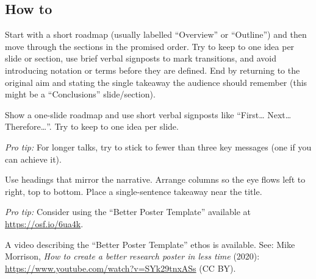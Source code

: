 \documentclass[
  a4paper,
  DIV=11,
  numbers=noendperiod,
  oneside]{scrreprt}
\begin{document}
\subsection{How to}\label{how-to-7}

Start with a short roadmap (usually labelled ``Overview'' or
``Outline'') and then move through the sections in the promised order.
Try to keep to one idea per slide or section, use brief verbal signposts
to mark transitions, and avoid introducing notation or terms before they
are defined. End by returning to the original aim and stating the single
takeaway the audience should remember (this might be a ``Conclusions''
slide/section).

\begin{tcolorbox}[enhanced jigsaw, colframe=quarto-callout-note-color-frame, title=\textcolor{quarto-callout-note-color}{\faInfo}\hspace{0.5em}{Talk Structure}, breakable, opacityback=0, titlerule=0mm, colbacktitle=quarto-callout-note-color!10!white, toptitle=1mm, colback=white, coltitle=black, toprule=.15mm, bottomtitle=1mm, left=2mm, arc=.35mm, rightrule=.15mm, bottomrule=.15mm, opacitybacktitle=0.6, leftrule=.75mm]

Show a one-slide roadmap and use short verbal signposts like
``First\ldots{} Next\ldots{} Therefore\ldots{}''. Try to keep to one
idea per slide.

\emph{Pro tip:} For longer talks, try to stick to fewer than three key
messages (one if you can achieve it).

\end{tcolorbox}

\begin{tcolorbox}[enhanced jigsaw, colframe=quarto-callout-note-color-frame, title=\textcolor{quarto-callout-note-color}{\faInfo}\hspace{0.5em}{Poster Structure}, breakable, opacityback=0, titlerule=0mm, colbacktitle=quarto-callout-note-color!10!white, toptitle=1mm, colback=white, coltitle=black, toprule=.15mm, bottomtitle=1mm, left=2mm, arc=.35mm, rightrule=.15mm, bottomrule=.15mm, opacitybacktitle=0.6, leftrule=.75mm]

Use headings that mirror the narrative. Arrange columns so the eye flows
left to right, top to bottom. Place a single-sentence takeaway near the
title.

\emph{Pro tip:} Consider using the ``Better Poster Template'' available
at \url{https://osf.io/6ua4k}.

A video describing the ``Better Poster Template'' ethos is available.
See: Mike Morrison, \emph{How to create a better research poster in less
time} (2020): \url{https://www.youtube.com/watch?v=SYk29tnxASs} (CC BY).

\end{tcolorbox}
\end{document}
